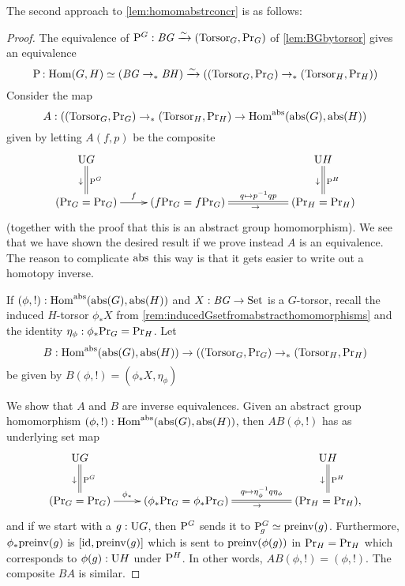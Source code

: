 \label{sec:absconctorsor}

The second approach to \cref{lem:homomabstrconcr} is as follows:


\begin{proof}
  The equivalence of $\mathrm{P}_{\!}^G:\mathit{B}\mathit{G}\xrightarrow{\sim}(\mathrm{Torsor}_G,\mathrm{Pr}_{{G}})$ of \cref{lem:BGbytorsor} gives an equivalence
$$\pathsp{}:\Hom(G,H)\oldequiv (\BG\to_*\BH)\we((\typetorsor_G,\princ G)\to_*(\typetorsor_H,\princ H))
$$
Consider the map
$$A:((\typetorsor_G,\princ G)\to_*(\typetorsor_H,\princ H)\to \Hom^\abstr(\abstr(G),\abstr(H))$$
given by letting $A(f,p)$ be the composite 
$$\xymatrix{\USym G\ar@{=}[d]^{\pathsp{}^G}_\downarrow&&&
  \USym H\ar@{=}[d]^{\pathsp{}^H}_\downarrow\\
  (\princ G=\princ G)\ar[r]^-f&
  (f\princ G=f\princ G)\ar@{=}[rr]^-{q\mapsto p^{-1}qp}_\to&&
  (\princ H=\princ H)
}$$
(together with the proof that this is an abstract group homomorphism).  We see that we have shown the desired result if we prove instead $A$ is an equivalence.  The reason to complicate $\mathrm{abs}$ this way is that it gets easier to write out a homotopy inverse.

If $(\phi,!):\Hom^\abstr(\abstr(G),\abstr(H))$ and $X:\mathit{B}\mathit{G}\to\mathrm{Set}$ is a $G$-torsor, recall the induced $H$-torsor $\phi_*X$ from \cref{rem:inducedGsetfromabstracthomomorphisms} and the identity $\eta_\phi:\phi_*\mathrm{Pr}_{{G}}=\mathrm{Pr}_{{H}}$. 
Let 
$$B: \Hom^\abstr(\abstr(G),\abstr(H))\to ((\typetorsor_G,\princ G)\to_*(\typetorsor_H,\princ H)$$
be given by $B(\phi,!)=(\phi_*X,\eta_\phi)$

We show that $A$ and $B$ are inverse equivalences.  Given an abstract group homomorphism $(\phi,!):\Hom^\abstr(\abstr(G),\abstr(H))$, then $AB(\phi,!)$ has as underlying set map
$$\xymatrix{\USym G\ar@{=}[d]^{\pathsp{}^G}_\downarrow&&&
  \USym H\ar@{=}[d]^{\pathsp{}^H}_\downarrow\\
  (\princ G=\princ G)\ar[r]^-{\phi_*}&
  (\phi_*\princ G=\phi_*\princ G)\ar@{=}[rr]^-{q\mapsto \eta_\phi^{-1}q\eta_\phi}_\to&&
  (\princ H=\princ H),
}$$
and if we start with a $g:\mathrm{U} G$, then $\mathrm{P}_{\!}^G$ sends it to $\pathsp g^G\oldequiv\preinv (g)$.  Furthermore, $\phi_*\mathrm{preinv} (g)$ is $[\mathord{\mathrm{id}},\mathrm{preinv} (g)]$ which is sent to $\mathrm{preinv} (\phi(g))$ in $\mathrm{Pr}_{{H}}=\mathrm{Pr}_{{H}}$ which corresponds to $\phi(g):\mathrm{U} H$ under $\mathrm{P}_{\!}^H$.  In other words, $AB(\phi,!)=(\phi,!)$.  The composite $BA$ is similar.
\end{proof}


